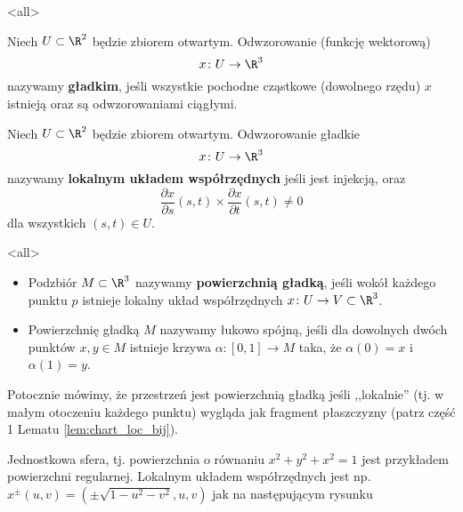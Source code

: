 \mode*
\mode<all>{}

\begin{frame}[<+->]
\begin{definicja}
Niech $U\subset\R^2$ będzie zbiorem otwartym. Odwzorowanie (funkcję wektorową) \[x\colon U\to \R^3\] nazywamy \textbf{gładkim}, jeśli wszystkie pochodne cząstkowe (dowolnego rzędu) $x$ istnieją oraz są odwzorowaniami ciągłymi.
\end{definicja}

\begin{definicja}
Niech $U\subset \R^2$ będzie zbiorem otwartym. Odwzorowanie gładkie
\[x\colon U\to \R^3\]
nazywamy \textbf{lokalnym układem współrzędnych} jeśli jest injekcją, oraz \[\frac{\partial x}{\partial s}(s,t)\times \frac{\partial x}{\partial t}(s,t)\neq 0\] dla wszystkich $(s,t)\in U$.
\end{definicja}

\end{frame}
\mode<all>{}
\begin{frame}[<+->]

\begin{definicja}\label{def:surface}
\begin{itemize}
\item 
Podzbiór $M\subset \R^3$ nazywamy \textbf{powierzchnią gładką}, jeśli wokół każdego punktu $p$ istnieje lokalny układ współrzędnych $x\colon U\to V\subset \R^3$. 


\item Powierzchnię gładką $M$ nazywamy łukowo spójną, jeśli dla dowolnych dwóch punktów $x,y\in M$ istnieje krzywa $\alpha\colon [0,1]\to M$ taka, że $\alpha(0)=x$ i $\alpha(1)=y$.
\end{itemize}
\end{definicja}

\pause Potocznie mówimy, że przestrzeń jest powierzchnią gładką jeśli ,,lokalnie'' (tj. w małym otoczeniu każdego punktu) wygląda jak fragment płaszczyzny (patrz część 1 Lematu \ref{lem:chart_loc_bij}).


\end{frame}
\begin{frame}[<+->]

\begin{przyklad}
Jednostkowa sfera, tj. powierzchnia o równaniu $x^2+y^2+x^2=1$ jest przykładem powierzchni regularnej. Lokalnym układem współrzędnych jest np. $x^\pm(u,v)=(\pm\sqrt{1-u^2-v^2},u,v)$ jak na następującym rysunku

\begin{center}

\end{center}
\end{przyklad}

\end{frame}

